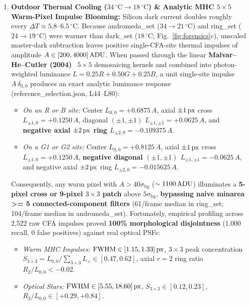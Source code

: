 \documentclass[10pt,twocolumn,letterpaper]{article}
\DeclareRobustCommand{\code}[1]{\texttt{#1}}
\def\code#1{#1}%
\def\allowbreak{}%
\begin{document}
\begin{enumerate}
  \item \textbf{Outdoor Thermal Cooling ($34\,^\circ\text{C} \to 18\,^\circ\text{C}$) \& Analytic MHC $5\times 5$ Warm-Pixel Impulse Blooming:}
  Silicon dark current doubles roughly every $\Delta T \approx 5.8\text{--}6.5\,^\circ\text{C}$. Because \code{andromeda\_set} ($34 \to 21\,^\circ\text{C}$) and \code{ring\_set} ($24 \to 19\,^\circ\text{C}$) were warmer than \code{dark\_set} ($18\,^\circ\text{C}$; Fig.~\ref{fig:forensics}c), unscaled master-dark subtraction leaves positive single-CFA-site thermal impulses of amplitude $A \in [200, 4000]\text{\,ADU}$. When passed through the linear \textbf{Malvar--He--Cutler (2004)}~\cite{malvar2004high} $5\times 5$ demosaicing kernels and combined into photon-weighted luminance $L = 0.25 R + 0.50 G + 0.25 B$, a unit single-site impulse $A\,\delta_{0,0}$ produces an exact analytic luminance response (\code{reference\_\allowbreak selection.json}, L44--L80):
  \begin{itemize}
    \item \emph{On an \code{R} or \code{B} site:} Center $L_{0,0} = +0.6875\,A$, axial $\pm 1\text{\,px}$ cross $L_{\pm 1, 0} = +0.1250\,A$, diagonal $(\pm 1, \pm 1)$ $L_{\pm 1, \pm 1} = +0.0625\,A$, and \textbf{negative axial $\pm 2\text{\,px}$ ring $L_{\pm 2, 0} = -0.109375\,A$}.
    \item \emph{On a \code{G1} or \code{G2} site:} Center $L_{0,0} = +0.8125\,A$, axial $\pm 1\text{\,px}$ cross $L_{\pm 1, 0} = +0.1250\,A$, \textbf{negative diagonal $(\pm 1, \pm 1)$ $L_{\pm 1, \pm 1} = -0.0625\,A$}, and negative axial $\pm 2\text{\,px}$ ring $L_{\pm 2, 0} = -0.015625\,A$.
  \end{itemize}
  Consequently, any warm pixel with $A > 40\sigma_{\text{bg}}$ ($\sim 1100\text{\,ADU}$) illuminates a \textbf{5-pixel cross or 9-pixel $3\times 3$ patch} above $5\sigma_{\text{bg}}$, \textbf{bypassing naive \code{minarea >= 5} connected-component filters} (\code{61/frame} median in \code{ring\_set}; \code{104/frame} median in \code{andromeda\_set}). Fortunately, empirical profiling across \code{2,522} raw CFA impulses proved \textbf{100\% morphological disjointness} (\code{1.000} recall, \code{0} false positives) against real optical PSFs:
  \begin{itemize}
    \item \emph{Warm MHC Impulses:} $\text{FWHM} \in [1.15, 1.33]\text{\,px}$, $3\times 3$ peak concentration $S_{3\times 3} = L_{0,0}/\sum_{3\times 3} L_+ \in [0.47, 0.62]$, axial $r=2$ ring ratio $R_2 / L_{0,0} < -0.02$.
    \item \emph{Optical Stars:} $\text{FWHM} \in [5.55, 18.60]\text{\,px}$, $S_{3\times 3} \in [0.12, 0.23]$, $R_2 / L_{0,0} \in [+0.29, +0.84]$.
  \end{itemize}
\end{enumerate}
\end{document}
